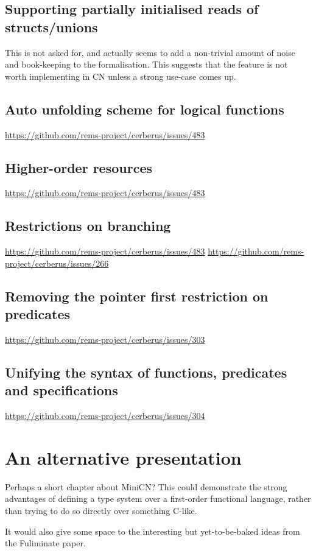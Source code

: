 \section{Supporting partially initialised reads of structs/unions}

This is not asked for, and actually seems to add a non-trivial amount of noise
and book-keeping to the formalisation. This suggests that the feature is not
worth implementing in CN unless a strong use-case comes up.

\section{Auto unfolding scheme for logical functions}
\url{https://github.com/rems-project/cerberus/issues/483}

\section{Higher-order resources}
\url{https://github.com/rems-project/cerberus/issues/483}

\section{Restrictions on branching}\label{sec:restriction-branching}
\url{https://github.com/rems-project/cerberus/issues/483}
\url{https://github.com/rems-project/cerberus/issues/266}

\section{Removing the pointer first restriction on predicates}\label{sec:rm-ptr-first}
\url{https://github.com/rems-project/cerberus/issues/303}

\section{Unifying the syntax of functions, predicates and specifications}
\url{https://github.com/rems-project/cerberus/issues/304}


\chapter{An alternative presentation}\label{chap:kernel-alternative}

Perhaps a short chapter about MiniCN\@? This could demonstrate the strong
advantages of defining a type system over a first-order functional language,
rather than trying to do so directly over something C-like.

It would also give some space to the interesting but yet-to-be-baked ideas
from the Fuliminate paper.


